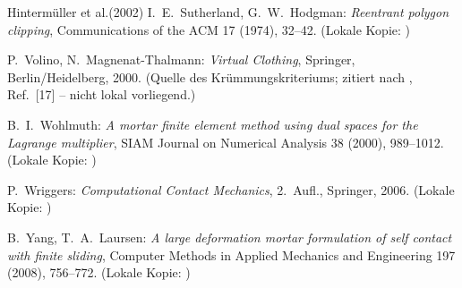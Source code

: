 \documentclass[a4paper,11pt]{article}
\begin{document}
\begin{thebibliography}{Hintermüller et al.(2002)}
 I.~E.~Sutherland, G.~W.~Hodgman: \emph{Reentrant polygon clipping}, Communications of the ACM 17 (1974), 32--42. (Lokale Kopie: )

 P.~Volino, N.~Magnenat-Thalmann: \emph{Virtual Clothing}, Springer, Berlin/Heidelberg, 2000. (Quelle des Krümmungskriteriums; zitiert nach \citealp{yang2008}, Ref.~[17] -- nicht lokal vorliegend.)

 B.~I.~Wohlmuth: \emph{A mortar finite element method using dual spaces for the Lagrange multiplier}, SIAM Journal on Numerical Analysis 38 (2000), 989--1012. (Lokale Kopie: )

 P.~Wriggers: \emph{Computational Contact Mechanics}, 2.~Aufl., Springer, 2006. (Lokale Kopie: )

 B.~Yang, T.~A.~Laursen: \emph{A large deformation mortar formulation of self contact with finite sliding}, Computer Methods in Applied Mechanics and Engineering 197 (2008), 756--772. (Lokale Kopie: )

\end{thebibliography}
\end{document}
